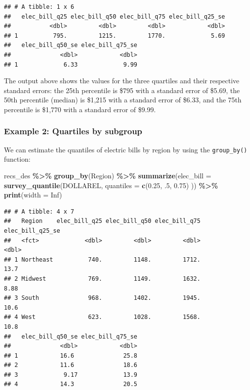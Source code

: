 \documentclass[
]{krantz}
\makeatletter
\newenvironment{Shaded}{\begin{snugshade}}{\end{snugshade}}
\newcommand{\AttributeTok}[1]{\textcolor[rgb]{0.27,0.27,0.27}{#1}}
\newcommand{\ConstantTok}[1]{\textcolor[rgb]{0.37,0.37,0.37}{#1}}
\newcommand{\DecValTok}[1]{\textcolor[rgb]{0.06,0.06,0.06}{#1}}
\newcommand{\FloatTok}[1]{\textcolor[rgb]{0.06,0.06,0.06}{#1}}
\newcommand{\FunctionTok}[1]{\textcolor[rgb]{0.27,0.27,0.27}{\textbf{#1}}}
\newcommand{\NormalTok}[1]{#1}
\newcommand{\SpecialCharTok}[1]{\textcolor[rgb]{0.43,0.43,0.43}{\textbf{#1}}}
\newenvironment{kframe}{%
\medskip{}
\setlength{\fboxsep}{.8em}
 \def\at@end@of@kframe{}%
 \ifinner\ifhmode%
  \def\at@end@of@kframe{\end{minipage}}%
  \begin{minipage}{\columnwidth}%
 \fi\fi%
 \def\FrameCommand##1{\hskip\@totalleftmargin \hskip-\fboxsep
 \colorbox{shadecolor}{##1}\hskip-\fboxsep
     \hskip-\linewidth \hskip-\@totalleftmargin \hskip\columnwidth}%
 \MakeFramed {\advance\hsize-\width
   \@totalleftmargin\z@ \linewidth\hsize
   \@setminipage}}%
 {\par\unskip\endMakeFramed%
 \at@end@of@kframe}
\renewenvironment{Shaded}{\begin{kframe}}{\end{kframe}}
\makeatother
\begin{document}
\begin{verbatim}
## # A tibble: 1 x 6
##   elec_bill_q25 elec_bill_q50 elec_bill_q75 elec_bill_q25_se
##           <dbl>         <dbl>         <dbl>            <dbl>
## 1          795.         1215.         1770.             5.69
##   elec_bill_q50_se elec_bill_q75_se
##              <dbl>            <dbl>
## 1             6.33             9.99
\end{verbatim}

The output above shows the values for the three quartiles and their respective standard errors: the 25th percentile is \$795 with a standard error of \$5.69, the 50th percentile (median) is \$1,215 with a standard error of \$6.33, and the 75th percentile is \$1,770 with a standard error of \$9.99.

\hypertarget{example-2-quartiles-by-subgroup}{%
\subsubsection*{Example 2: Quartiles by subgroup}\label{example-2-quartiles-by-subgroup}}


We can estimate the quantiles of electric bills by region by using the \texttt{group\_by()} function:

\begin{Shaded}
\begin{Highlighting}[]
\NormalTok{recs\_des }\SpecialCharTok{\%\textgreater{}\%}
  \FunctionTok{group\_by}\NormalTok{(Region) }\SpecialCharTok{\%\textgreater{}\%}
  \FunctionTok{summarize}\NormalTok{(}\AttributeTok{elec\_bill =} \FunctionTok{survey\_quantile}\NormalTok{(DOLLAREL,}
    \AttributeTok{quantiles =} \FunctionTok{c}\NormalTok{(}\FloatTok{0.25}\NormalTok{, .}\DecValTok{5}\NormalTok{, }\FloatTok{0.75}\NormalTok{)}
\NormalTok{  )) }\SpecialCharTok{\%\textgreater{}\%}
  \FunctionTok{print}\NormalTok{(}\AttributeTok{width =} \ConstantTok{Inf}\NormalTok{)}
\end{Highlighting}
\end{Shaded}

\begin{verbatim}
## # A tibble: 4 x 7
##   Region    elec_bill_q25 elec_bill_q50 elec_bill_q75 elec_bill_q25_se
##   <fct>             <dbl>         <dbl>         <dbl>            <dbl>
## 1 Northeast          740.         1148.         1712.            13.7 
## 2 Midwest            769.         1149.         1632.             8.88
## 3 South              968.         1402.         1945.            10.6 
## 4 West               623.         1028.         1568.            10.8 
##   elec_bill_q50_se elec_bill_q75_se
##              <dbl>            <dbl>
## 1            16.6              25.8
## 2            11.6              18.6
## 3             9.17             13.9
## 4            14.3              20.5
\end{verbatim}
\end{document}

